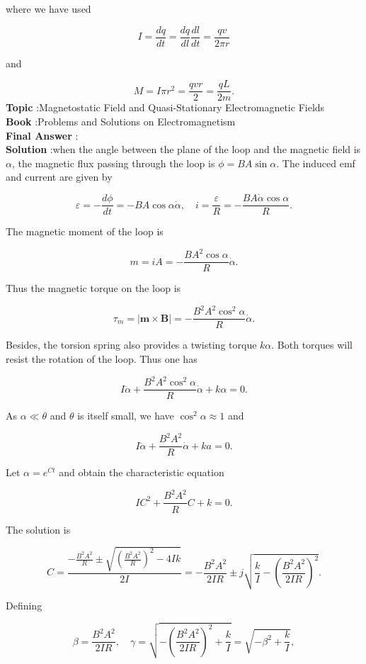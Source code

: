 \documentclass[10pt]{article}
\begin{document}
where we have used

$$
I=\frac{d q}{d t}=\frac{d q}{d l} \frac{d l}{d t}=\frac{q v}{2 \pi r}
$$

and

$$
M=I \pi r^{2}=\frac{q v r}{2}=\frac{q L}{2 m} .
$$
\textbf{Topic} :Magnetostatic Field and Quasi-Stationary Electromagnetic Fields\\
\textbf{Book} :Problems and Solutions on Electromagnetism\\
\textbf{Final Answer} :\\


\textbf{Solution} :when the angle between the plane of the loop and the magnetic field is $\alpha$, the magnetic flux passing through the loop is $\phi=B A \sin \alpha$. The induced emf and current are given by

$$
\varepsilon=-\frac{d \phi}{d t}=-B A \cos \alpha \dot{\alpha}, \quad i=\frac{\varepsilon}{R}=-\frac{B A \dot{\alpha} \cos \alpha}{R} .
$$

The magnetic moment of the loop is

$$
m=i A=-\frac{B A^{2} \cos \alpha}{R} \dot{\alpha} .
$$

Thus the magnetic torque on the loop is

$$
\tau_{m}=|\mathbf{m} \times \mathbf{B}|=-\frac{B^{2} A^{2} \cos ^{2} \alpha}{R} \dot{\alpha} .
$$

Besides, the torsion spring also provides a twisting torque $k \alpha$. Both torques will resist the rotation of the loop. Thus one has

$$
I \ddot{\alpha}+\frac{B^{2} A^{2} \cos ^{2} \alpha}{R} \dot{\alpha}+k \alpha=0 .
$$

As $\alpha \ll \theta$ and $\theta$ is itself small, we have $\cos ^{2} \alpha \approx 1$ and

$$
I \ddot{\alpha}+\frac{B^{2} A^{2}}{R} \dot{\alpha}+k a=0 .
$$

Let $\alpha=e^{C t}$ and obtain the characteristic equation

$$
I C^{2}+\frac{B^{2} A^{2}}{R} C+k=0 .
$$

The solution is

$$
C=\frac{-\frac{B^{2} A^{2}}{R} \pm \sqrt{\left(\frac{B^{2} A^{2}}{R}\right)^{2}-4 I k}}{2 I}=-\frac{B^{2} A^{2}}{2 I R} \pm j \sqrt{\frac{k}{I}-\left(\frac{B^{2} A^{2}}{2 I R}\right)^{2}} .
$$

Defining

$$
\beta=\frac{B^{2} A^{2}}{2 I R}, \quad \gamma=\sqrt{-\left(\frac{B^{2} A^{2}}{2 I R}\right)^{2}+\frac{k}{I}}=\sqrt{-\beta^{2}+\frac{k}{I}},
$$
\end{document}
